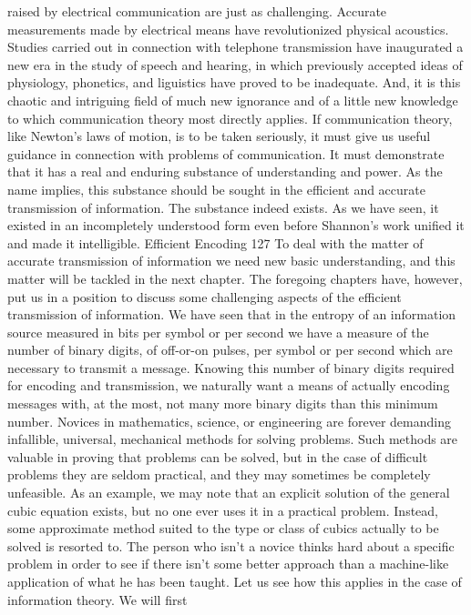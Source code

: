 {{{raised by electrical communication are just as challenging. Accurate
measurements made by electrical means have revolutionized
physical acoustics. Studies carried out in connection with telephone
transmission have inaugurated a new era in the study of
speech and hearing, in which previously accepted ideas of physiology,
phonetics, and liguistics have proved to be inadequate.
And, it is this chaotic and intriguing field of much new ignorance
and of a little new knowledge to which communication theory
most directly applies.
If communication theory, like Newton’s laws of motion, is to be
taken seriously, it must give us useful guidance in connection with
problems of communication. It must demonstrate that it has a
real and enduring substance of understanding and power. As the
name implies, this substance should be sought in the efficient and
accurate transmission of information. The substance indeed exists.
As we have seen, it existed in an incompletely understood form
even before Shannon’s work unified it and made it intelligible.
Efficient Encoding 127
To deal with the matter of accurate transmission of information
we need new basic understanding, and this matter will be tackled
in the next chapter. The foregoing chapters have, however, put us
in a position to discuss some challenging aspects of the efficient
transmission of information.
We have seen that in the entropy of an information source
measured in bits per symbol or per second we have a measure of
the number of binary digits, of off-or-on pulses, per symbol or per
second which are necessary to transmit a message. Knowing this
number of binary digits required for encoding and transmission, we
naturally want a means of actually encoding messages with, at the
most, not many more binary digits than this minimum number.
Novices in mathematics, science, or engineering are forever demanding
infallible, universal, mechanical methods for solving
problems. Such methods are valuable in proving that problems
can be solved, but in the case of difficult problems they are seldom
practical, and they may sometimes be completely unfeasible.
As an example, we may note that an explicit solution of the general
cubic equation exists, but no one ever uses it in a practical
problem. Instead, some approximate method suited to the type or
class of cubics actually to be solved is resorted to.
The person who isn’t a novice thinks hard about a specific problem
in order to see if there isn’t some better approach than a
machine-like application of what he has been taught. Let us see
how this applies in the case of information theory. We will first
}}}
